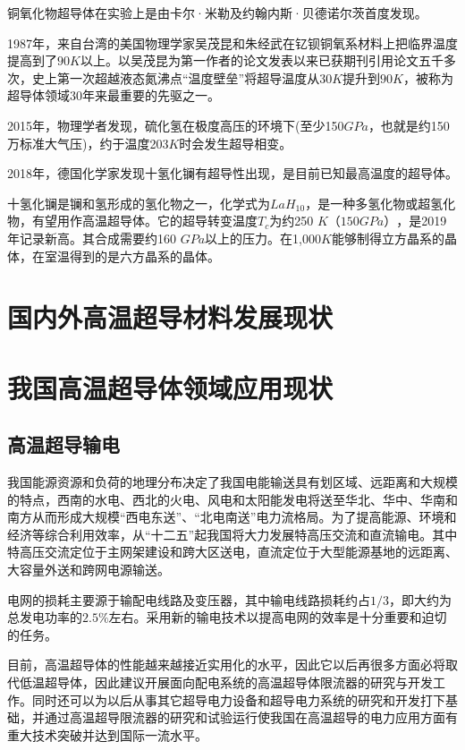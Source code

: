 \documentclass[UTF8, twocolumn]{ctexart}
\begin{document}
    铜氧化物超导体在实验上是由卡尔·米勒及约翰内斯·贝德诺尔茨首度发现。

    1987年，来自台湾的美国物理学家吴茂昆和朱经武在钇钡铜氧系材料上把临界温度提高到了$90K$以上。以吴茂昆为第一作者的论文\cite{PhysRevLett.58.908}发表以来已获期刊引用论文五千多次，史上第一次超越液态氮沸点“温度壁垒”将超导温度从$30K$提升到$90K$，被称为超导体领域30年来最重要的先驱之一。

    2015年，物理学者发现，硫化氢在极度高压的环境下(至少150$GPa$，也就是约150万标准大气压)，约于温度203$K$时会发生超导相变\cite{drozdov2015conventional}。

    2018年，德国化学家发现十氢化镧有超导性出现，是目前已知最高温度的超导体。

    十氢化镧是镧和氢形成的氢化物之一，化学式为$LaH_{10}$，是一种多氢化物或超氢化物，有望用作高温超导体。它的超导转变温度$T_c$为约250 $K$$（150 GPa）$，是2019年记录新高。其合成需要约160 $GPa$以上的压力。在1,000$ K$能够制得立方晶系的晶体，在室温得到的是六方晶系的晶体\cite{drozdov2019superconductivity}。

\section{国内外高温超导材料发展现状}

\section{我国高温超导体领域应用现状}

    \subsection{高温超导输电}

    我国能源资源和负荷的地理分布决定了我国电能输送具有划区域、远距离和大规模的特点，西南的水电、西北的火电、风电和太阳能发电将送至华北、华中、华南和南方从而形成大规模“西电东送”、“北电南送”电力流格局\cite{严陆光2014关于发展高温超导输电的建议}。为了提高能源、环境和经济等综合利用效率，从“十二五”起我国将大力发展特高压交流和直流输电。其中特高压交流定位于主网架建设和跨大区送电，直流定位于大型能源基地的远距离、大容量外送和跨网电源输送。

    电网的损耗主要源于输配电线路及变压器，其中输电线路损耗约占$1/3$，即大约为总发电功率的$2.5\%$左右。采用新的输电技术以提高电网的效率是十分重要和迫切的任务。

    目前，高温超导体的性能越来越接近实用化的水平，因此它以后再很多方面必将取代低温超导体，因此建议开展面向配电系统的高温超导体限流器的研究与开发工作。同时还可以为以后从事其它超导电力设备和超导电力系统的研究和开发打下基础，并通过高温超导限流器的研究和试验运行使我国在高温超导的电力应用方面有重大技术突破并达到国际一流水平\cite{肖立业1999超导限流器}。
\end{document}
